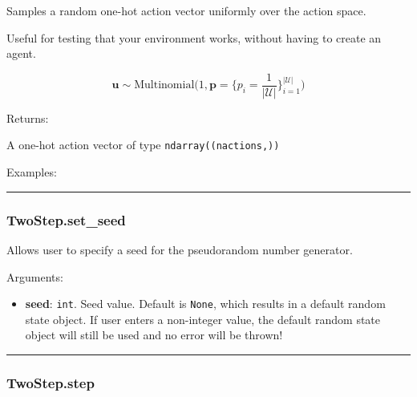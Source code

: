 Samples a random one-hot action vector uniformly over the action space.

Useful for testing that your environment works, without having to create
an agent.

\[
\mathbf u \sim \mathrm{Multinomial}\Big(1, \mathbf p=\{p_i = \frac{1}{|\mathcal U|}\}_{i=1}^{|\mathcal U|}\Big)
\]

Returns:

A one-hot action vector of type \texttt{ndarray((nactions,))}

Examples:

\begin{Shaded}
\begin{Highlighting}[]
\OperatorTok{=}
\end{Highlighting}
\end{Shaded}

\begin{center}\rule{0.5\linewidth}{\linethickness}\end{center}

\subsubsection{TwoStep.set\_seed}\label{twostep.set_seed}

\begin{Shaded}
\begin{Highlighting}[]
\OperatorTok{=}\NormalTok{)}
\end{Highlighting}
\end{Shaded}

Allows user to specify a seed for the pseudorandom number generator.

Arguments:

\begin{itemize}
\tightlist
\item
  \textbf{seed}: \texttt{int}. Seed value. Default is \texttt{None},
  which results in a default random state object. If user enters a
  non-integer value, the default random state object will still be used
  and no error will be thrown!
\end{itemize}

\begin{center}\rule{0.5\linewidth}{\linethickness}\end{center}

\subsubsection{TwoStep.step}\label{twostep.step}

